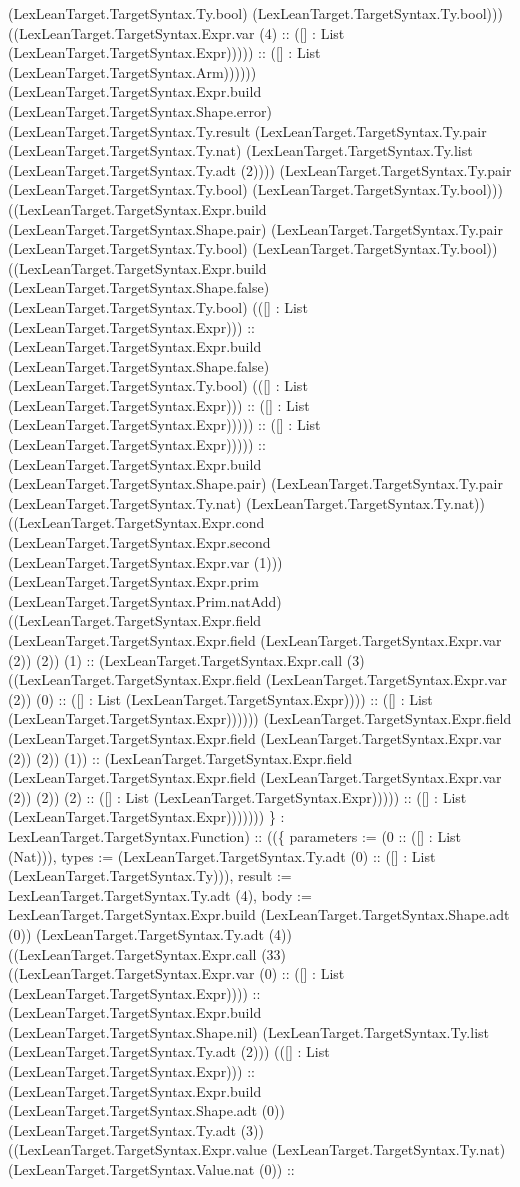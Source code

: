\documentclass[11pt]{article}
\begin{document}
(LexLeanTarget.TargetSyntax.Ty.bool) (LexLeanTarget.TargetSyntax.Ty.bool))) ((LexLeanTarget.TargetSyntax.Expr.var (4) :: ([] : List (LexLeanTarget.TargetSyntax.Expr))))) :: ([] : List (LexLeanTarget.TargetSyntax.Arm)))))) (LexLeanTarget.TargetSyntax.Expr.build (LexLeanTarget.TargetSyntax.Shape.error) (LexLeanTarget.TargetSyntax.Ty.result (LexLeanTarget.TargetSyntax.Ty.pair (LexLeanTarget.TargetSyntax.Ty.nat) (LexLeanTarget.TargetSyntax.Ty.list (LexLeanTarget.TargetSyntax.Ty.adt (2)))) (LexLeanTarget.TargetSyntax.Ty.pair (LexLeanTarget.TargetSyntax.Ty.bool) (LexLeanTarget.TargetSyntax.Ty.bool))) ((LexLeanTarget.TargetSyntax.Expr.build (LexLeanTarget.TargetSyntax.Shape.pair) (LexLeanTarget.TargetSyntax.Ty.pair (LexLeanTarget.TargetSyntax.Ty.bool) (LexLeanTarget.TargetSyntax.Ty.bool)) ((LexLeanTarget.TargetSyntax.Expr.build (LexLeanTarget.TargetSyntax.Shape.false) (LexLeanTarget.TargetSyntax.Ty.bool) (([] : List (LexLeanTarget.TargetSyntax.Expr))) :: (LexLeanTarget.TargetSyntax.Expr.build (LexLeanTarget.TargetSyntax.Shape.false) (LexLeanTarget.TargetSyntax.Ty.bool) (([] : List (LexLeanTarget.TargetSyntax.Expr))) :: ([] : List (LexLeanTarget.TargetSyntax.Expr))))) :: ([] : List (LexLeanTarget.TargetSyntax.Expr))))) :: (LexLeanTarget.TargetSyntax.Expr.build (LexLeanTarget.TargetSyntax.Shape.pair) (LexLeanTarget.TargetSyntax.Ty.pair (LexLeanTarget.TargetSyntax.Ty.nat) (LexLeanTarget.TargetSyntax.Ty.nat)) ((LexLeanTarget.TargetSyntax.Expr.cond (LexLeanTarget.TargetSyntax.Expr.second (LexLeanTarget.TargetSyntax.Expr.var (1))) (LexLeanTarget.TargetSyntax.Expr.prim (LexLeanTarget.TargetSyntax.Prim.natAdd) ((LexLeanTarget.TargetSyntax.Expr.field (LexLeanTarget.TargetSyntax.Expr.field (LexLeanTarget.TargetSyntax.Expr.var (2)) (2)) (1) :: (LexLeanTarget.TargetSyntax.Expr.call (3) ((LexLeanTarget.TargetSyntax.Expr.field (LexLeanTarget.TargetSyntax.Expr.var (2)) (0) :: ([] : List (LexLeanTarget.TargetSyntax.Expr)))) :: ([] : List (LexLeanTarget.TargetSyntax.Expr)))))) (LexLeanTarget.TargetSyntax.Expr.field (LexLeanTarget.TargetSyntax.Expr.field (LexLeanTarget.TargetSyntax.Expr.var (2)) (2)) (1)) :: (LexLeanTarget.TargetSyntax.Expr.field (LexLeanTarget.TargetSyntax.Expr.field (LexLeanTarget.TargetSyntax.Expr.var (2)) (2)) (2) :: ([] : List (LexLeanTarget.TargetSyntax.Expr))))) :: ([] : List (LexLeanTarget.TargetSyntax.Expr))))))) \} : LexLeanTarget.TargetSyntax.Function) :: ((\{ parameters := (0 :: ([] : List (Nat))), types := (LexLeanTarget.TargetSyntax.Ty.adt (0) :: ([] : List (LexLeanTarget.TargetSyntax.Ty))), result := LexLeanTarget.TargetSyntax.Ty.adt (4), body := LexLeanTarget.TargetSyntax.Expr.build (LexLeanTarget.TargetSyntax.Shape.adt (0)) (LexLeanTarget.TargetSyntax.Ty.adt (4)) ((LexLeanTarget.TargetSyntax.Expr.call (33) ((LexLeanTarget.TargetSyntax.Expr.var (0) :: ([] : List (LexLeanTarget.TargetSyntax.Expr)))) :: (LexLeanTarget.TargetSyntax.Expr.build (LexLeanTarget.TargetSyntax.Shape.nil) (LexLeanTarget.TargetSyntax.Ty.list (LexLeanTarget.TargetSyntax.Ty.adt (2))) (([] : List (LexLeanTarget.TargetSyntax.Expr))) :: (LexLeanTarget.TargetSyntax.Expr.build (LexLeanTarget.TargetSyntax.Shape.adt (0)) (LexLeanTarget.TargetSyntax.Ty.adt (3)) ((LexLeanTarget.TargetSyntax.Expr.value (LexLeanTarget.TargetSyntax.Ty.nat) (LexLeanTarget.TargetSyntax.Value.nat (0)) :: 
\end{document}
